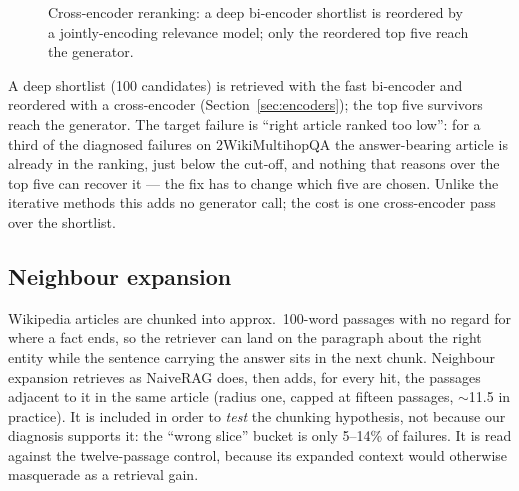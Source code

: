 \begin{figure}[t]
\centering
{}
\caption{Cross-encoder reranking: a deep bi-encoder shortlist is reordered
by a jointly-encoding relevance model; only the reordered top five reach
the generator.}
\label{fig:arch-rerank}
\end{figure}

A deep shortlist (100 candidates) is retrieved with the fast bi-encoder and
reordered with a cross-encoder (Section~\ref{sec:encoders}); the top five
survivors reach the generator. The target failure is ``right article
ranked too low'': for a third of the diagnosed failures on 2WikiMultihopQA
the answer-bearing article is already in the ranking, just below the
cut-off, and nothing that reasons over the top five can recover it --- the
fix has to change which five are chosen. Unlike the iterative methods this
adds no generator call; the cost is one cross-encoder pass over the
shortlist.

\subsection{Neighbour expansion}
\label{sec:arch-neighbour}

Wikipedia articles are chunked into approx.\ 100-word passages with no regard
for where a fact ends, so the retriever can land on the paragraph about the
right entity while the sentence carrying the answer sits in the next chunk.
Neighbour expansion retrieves as NaiveRAG does, then adds, for every hit,
the passages adjacent to it in the same article (radius one, capped at
fifteen passages, $\sim$11.5 in practice). It is included in order to \emph{test}
the chunking hypothesis, not because our diagnosis supports it: the
``wrong slice'' bucket is only 5--14\% of failures. It is read against
the twelve-passage control, because its expanded context would
otherwise masquerade as a retrieval gain.

